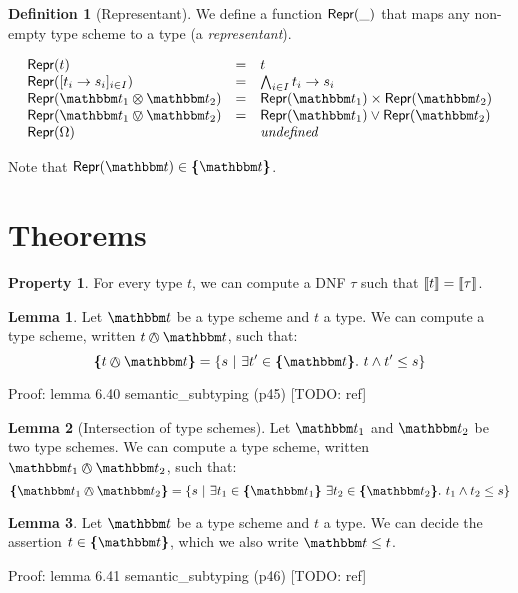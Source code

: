 \documentclass[a4paper]{article}
\theoremstyle{definition}
\newtheorem{lemma}{Lemma}
\newtheorem{definition}{Definition}
\newtheorem{property}{Property}
\begin{document}
    \begin{definition}[Representant]
      We define a function $\textsf{Repr}(\_)$ that maps any non-empty type scheme to a type (a \textit{representant}).

      \begin{align*}
        \begin{array}{lcl}
        \tsrep t &=& t\\
        \tsrep {\tsfunone {t_i} {s_i}_{i\in I}} &=& \bigwedge_{i\in I} \arrow {t_i} {s_i}\\
        \tsrep {\ts_1 \tstimes \ts_2} &=& \pair {\tsrep {\ts_1}} {\tsrep {\ts_2}}\\
        \tsrep {\ts_1 \tsor \ts_2} &=& \tsrep {\ts_1} \vee \tsrep {\ts_2}\\
        \tsrep \tsempty && \textit{undefined}
        \end{array}
      \end{align*}

    Note that $\tsrep \ts \in \tsint \ts$.
    \end{definition}

    \section{Theorems}

    \begin{property}
      For every type $t$, we can compute a DNF $\tau$ such that ${\llbracket t \rrbracket} = {\llbracket \tau \rrbracket}$.
    \end{property}

    \begin{lemma}
      Let $\ts$ be a type scheme and $t$ a type. We can compute a type scheme, written $t \tsand \ts$, such that:
      \[\tsint {t \tsand \ts} = \{s \alt \exists t' \in \tsint \ts.\ t \land t' \leq s \}\]
    \end{lemma}
    Proof: lemma 6.40 semantic\_subtyping (p45) [TODO: ref]

    \begin{lemma}[Intersection of type schemes]
      Let $\ts_1$ and $\ts_2$ be two type schemes. We can compute a type scheme, written $\ts_1 \tsand \ts_2$, such that:
      \[\tsint {\ts_1 \tsand \ts_2} = \{s\alt \exists t_1 \in \tsint {\ts_1}\ 
      \exists t_2 \in \tsint {\ts_2}.\ {t_1} \land {t_2} \leq s\}\]
    \end{lemma}

    \begin{lemma}
      Let $\ts$ be a type scheme and $t$ a type. We can decide the assertion $t \in \tsint \ts$,
      which we also write $\ts \leq t$.
    \end{lemma}
    Proof: lemma 6.41 semantic\_subtyping (p46) [TODO: ref]
\end{document}
